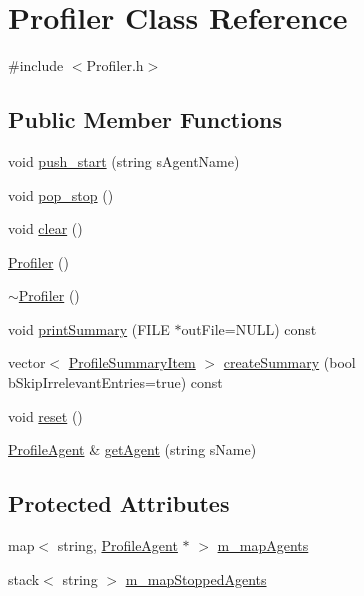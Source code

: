 \hypertarget{class_profiler}{}\section{Profiler Class Reference}
\label{class_profiler}


{\ttfamily \#include $<$Profiler.\+h$>$}

\subsection*{Public Member Functions}
\begin{DoxyCompactItemize}
\item 
void \hyperlink{class_profiler_aad319c9a5c095ccce87c4e9f90c4dd15}{push\+\_\+start} (string s\+Agent\+Name)
\item 
void \hyperlink{class_profiler_aed892ccd9527b4bf54af37621e1c913d}{pop\+\_\+stop} ()
\item 
void \hyperlink{class_profiler_a69efd6617fa713b02fbe953d8c16e4db}{clear} ()
\item 
\hyperlink{class_profiler_a675ebc9207b9aeace1d967c085abeacf}{Profiler} ()
\item 
\hyperlink{class_profiler_a1e6dd8f6cfb15cd5237b971d8f49c749}{$\sim$\+Profiler} ()
\item 
void \hyperlink{class_profiler_a5a95baf5d5339da6e871d84f6122a1ef}{print\+Summary} (F\+I\+L\+E $\ast$out\+File=N\+U\+L\+L) const 
\item 
vector$<$ \hyperlink{struct_profile_summary_item}{Profile\+Summary\+Item} $>$ \hyperlink{class_profiler_a3a9331ea2bf3d331a39c1c281a84c093}{create\+Summary} (bool b\+Skip\+Irrelevant\+Entries=true) const 
\item 
void \hyperlink{class_profiler_a1f2fdbd66925222007a1461ecd4d01f9}{reset} ()
\item 
\hyperlink{class_profile_agent}{Profile\+Agent} \& \hyperlink{class_profiler_a31b511654f7addcef16776092ab6cdf0}{get\+Agent} (string s\+Name)
\end{DoxyCompactItemize}
\subsection*{Protected Attributes}
\begin{DoxyCompactItemize}
\item 
map$<$ string, \hyperlink{class_profile_agent}{Profile\+Agent} $\ast$ $>$ \hyperlink{class_profiler_a289df33e2c71075ff9bf2d2c3e180c02}{m\+\_\+map\+Agents}
\item 
stack$<$ string $>$ \hyperlink{class_profiler_a898eec43a1f9c8ed482d169e90f4a7bd}{m\+\_\+map\+Stopped\+Agents}
\end{DoxyCompactItemize}
